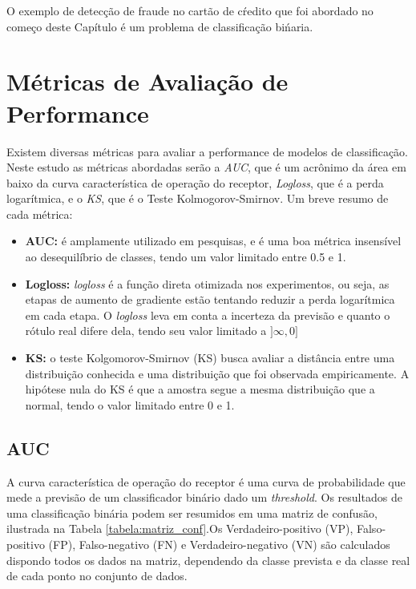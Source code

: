 O exemplo de detecção de fraude no cartão de cŕedito que foi abordado no começo deste Capítulo é um problema de classificação bińaria.

\section{Métricas de Avaliação de Performance}
Existem diversas métricas para avaliar a performance de modelos de classificação. Neste estudo as métricas abordadas serão a \textit{AUC}, que é um acrônimo da área em baixo da curva característica de operação do receptor, \textit{Logloss}, que é a perda logarítmica, e o \textit{KS}, que é o Teste Kolmogorov-Smirnov. Um breve resumo de cada métrica:

\begin{itemize}
    \item \textbf{AUC:} é amplamente utilizado em pesquisas, e é uma boa métrica insensível ao desequilíbrio de classes, tendo um valor limitado entre 0.5 e 1.
    \item \textbf{Logloss:} \textit{logloss} é a função direta otimizada nos experimentos, ou seja, as etapas de aumento de gradiente estão tentando reduzir a perda logarítmica em cada etapa. O \textit{logloss} leva em conta a incerteza da previsão e quanto o rótulo real difere dela, tendo seu valor limitado a $]\infty,0]$
    \item \textbf{KS:} o teste Kolgomorov-Smirnov (KS) busca avaliar a distância entre uma distribuição conhecida e uma distribuição que foi observada empiricamente. A hipótese nula do KS é que a amostra segue a mesma distribuição que a normal, tendo o valor limitado entre 0 e 1.
\end{itemize}

\subsection{AUC}

A curva característica de operação do receptor é uma curva de probabilidade que mede a previsão de um classificador binário dado um \textit{threshold}. Os resultados de uma classificação binária podem ser resumidos em uma matriz de confusão, ilustrada na Tabela \ref{tabela:matriz_conf}.Os Verdadeiro-positivo (VP), Falso-positivo (FP), Falso-negativo (FN) e Verdadeiro-negativo (VN) são calculados dispondo todos os dados na matriz, dependendo da classe prevista e da classe real de cada ponto no conjunto de dados.

